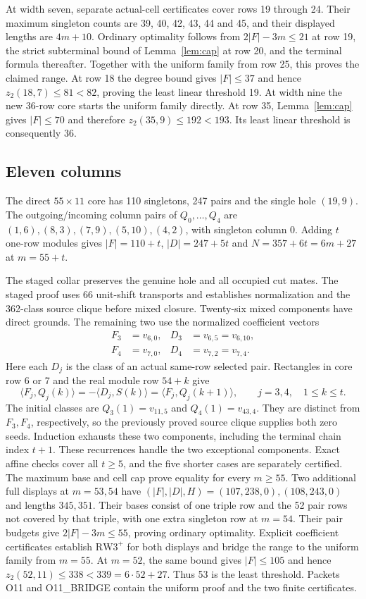 \documentclass[11pt,a4paper]{article}
\theoremstyle{definition}
\newcommand{\zt}{z_2}
\newcommand{\RW}{\mathrm{RW3}^{+}}
\begin{document}
At width seven, separate actual-cell certificates cover rows 19 through
24. Their maximum singleton counts are 39, 40, 42, 43, 44 and 45, and
their displayed lengths are $4m+10$. Ordinary optimality follows from
$2|F|-3m\le21$ at row 19, the strict subterminal bound of
Lemma~\ref{lem:cap} at row 20, and the terminal formula thereafter.
Together with the uniform family from row 25, this proves the claimed
range. At row 18 the degree bound gives $|F|\le37$ and hence
$\zt(18,7)\le81<82$, proving the least linear threshold 19.
At width nine the new 36-row core starts the uniform family directly.
At row 35, Lemma~\ref{lem:cap} gives $|F|\le70$ and therefore
$\zt(35,9)\le192<193$. Its least linear threshold is consequently 36.

\subsection{Eleven columns}
The direct $55\times11$ core has 110 singletons, 247 pairs and the
single hole $(19,9)$. The outgoing/incoming column pairs of
$Q_0,\ldots,Q_4$ are $(1,6),(8,3),(7,9),(5,10),(4,2)$, with
singleton column 0. Adding $t$ one-row modules gives
$|F|=110+t$, $|D|=247+5t$ and $N=357+6t=6m+27$ at $m=55+t$.

The staged collar preserves the genuine hole and all occupied cut
mates. The staged proof uses 66 unit-shift transports and establishes
normalization and the 362-class source clique before mixed closure. Twenty-six mixed
components have direct grounds. The remaining two use the normalized
coefficient vectors
\[
\begin{aligned}
 F_3&=v_{6,0},& D_3&=v_{6,5}=v_{6,10},\\
 F_4&=v_{7,0},& D_4&=v_{7,2}=v_{7,4}.
\end{aligned}
\]
Here each $D_j$ is the class of an actual same-row selected pair.
Rectangles in core row 6 or 7 and the real module row $54+k$ give
\begin{equation}\label{eq:elevenrecurrence}
 \langle F_j,Q_j(k)\rangle
   =-\langle D_j,S(k)\rangle
   =\langle F_j,Q_j(k+1)\rangle,
 \qquad j=3,4,\quad1\le k\le t.
\end{equation}
The initial classes are $Q_3(1)=v_{11,5}$ and $Q_4(1)=v_{43,4}$.
They are distinct from $F_3,F_4$, respectively, so the previously
proved source clique supplies both zero seeds. Induction exhausts
these two components, including the terminal chain index $t+1$.
These recurrences handle the two exceptional components. Exact affine checks cover
all $t\ge5$, and the five shorter cases are separately certified.
The maximum base and cell cap prove equality for every $m\ge55$.
Two additional full displays at $m=53,54$ have
$(|F|,|D|,H)=(107,238,0),(108,243,0)$ and lengths $345,351$.
Their bases consist of one triple row and the 52 pair rows not covered
by that triple, with one extra singleton row at $m=54$. Their pair
budgets give $2|F|-3m\le55$, proving ordinary optimality. Explicit
coefficient certificates establish $\RW$ for both displays and bridge
the range to the uniform family from $m=55$.
At $m=52$, the same bound gives $|F|\le105$ and hence
$\zt(52,11)\le338<339=6\cdot52+27$. Thus 53 is the least threshold.
Packets O11 and O11\_BRIDGE contain the uniform proof and the two finite
certificates.
\end{document}
